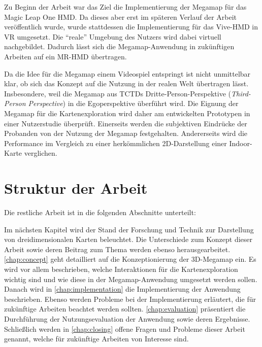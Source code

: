 Zu Beginn der Arbeit war das Ziel die Implementierung der Megamap für das Magic Leap One HMD.
Da dieses aber erst im späteren Verlauf der Arbeit veröffentlich wurde, wurde stattdessen die Implementierung für das Vive-HMD in VR umgesetzt.
Die \enquote{reale} Umgebung des Nutzers wird dabei virtuell nachgebildet.
Dadurch lässt sich die Megamap-Anwendung in zukünftigen Arbeiten auf ein MR-HMD übertragen.



Da die Idee für die Megamap einem Videospiel entspringt ist nicht unmittelbar klar, ob sich das Konzept auf die Nutzung in der realen Welt übertragen lässt.
Insbesondere, weil die Megamap aus TCTDs Dritte-Person-Perspektive (\emph{Third-Person Perspective}) in die Egoperspektive überführt wird.
Die Eignung der Megamap für die Kartenexploration wird daher am entwickelten Prototypen in einer Nutzerstudie überprüft.
Einerseits werden die subjektiven Eindrücke der Probanden von der Nutzung der Megamap festgehalten.
Andererseits wird die Performance im Vergleich zu einer herkömmlichen 2D-Darstellung einer Indoor-Karte verglichen.

\section{Struktur der Arbeit}
\label{sec:struktur}
Die restliche Arbeit ist in die folgenden Abschnitte unterteilt:

\noindent
Im nächsten Kapitel wird der Stand der Forschung und Technik zur Darstellung von dreidimensionalen Karten beleuchtet.
Die Unterschiede zum Konzept dieser Arbeit sowie deren Beitrag zum Thema werden ebenso herausgearbeitet.
\autoref{chap:concept} geht detailliert auf die Konzeptionierung der 3D-Megamap ein.
Es wird vor allem beschrieben, welche Interaktionen für die Kartenexploration wichtig sind und wie diese in der Megamap-Anwendung umgesetzt werden sollen.
Danach wird in \autoref{chap:implementation} die Implementierung der Anwendung beschrieben.
Ebenso werden Probleme bei der Implementierung erläutert, die für zukünftige Arbeiten beachtet werden sollten.
\autoref{chap:evaluation} präsentiert die Durchführung der Nutzungsevaluation der Anwendung sowie deren Ergebnisse.
Schließlich werden in \autoref{chap:closing} offene Fragen und Probleme dieser Arbeit genannt, welche für zukünftige Arbeiten von Interesse sind.
%
\cleardoublepage
